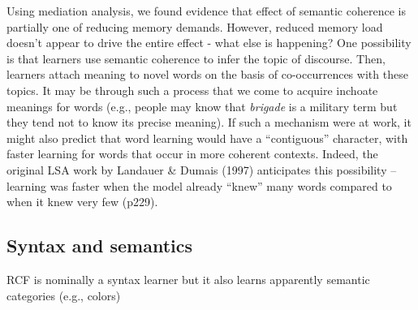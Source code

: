 \documentclass[man,floatsintext]{apa6}
\begin{document}
Using mediation analysis, we found evidence that effect of semantic coherence is partially one of reducing memory demands. However, reduced memory load doesn't appear to drive the entire effect - what else is happening? One possibility is that learners use semantic coherence to infer the topic of discourse. Then, learners attach meaning to novel words on the basis of co-occurrences with these topics. It may be through such a process that we come to acquire inchoate meanings for words (e.g., people may know that \emph{brigade} is a military term but they tend not to know its precise meaning). If such a mechanism were at work, it might also predict that word learning would have a ``contiguous'' character, with faster learning for words that occur in more coherent contexts. Indeed, the original LSA work by Landauer \& Dumais (1997) anticipates this possibility -- learning was faster when the model already ``knew'' many words compared to when it knew very few (p229).


\subsection{Syntax and semantics}
RCF is nominally a syntax learner but it also learns apparently semantic categories (e.g., colors)




\nocite{*}
\newpage


\end{document}

